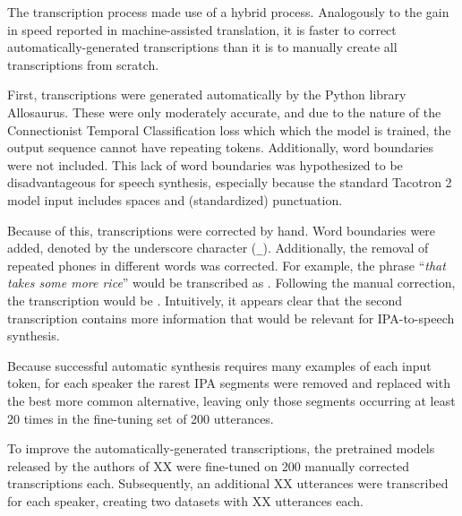 The transcription process made use of a hybrid process. Analogously to the gain in speed reported in 
machine-assisted translation, it is faster to correct automatically-generated transcriptions than it is to 
manually create all transcriptions from scratch.

First, transcriptions were generated automatically by the Python library Allosaurus. 
These were only moderately accurate, and due to the nature of the Connectionist Temporal Classification 
loss which which the model is trained, the output sequence cannot have 
repeating tokens. Additionally, word boundaries were not included. This lack of word boundaries was 
hypothesized to be disadvantageous for speech synthesis, especially because the standard Tacotron 2 model 
input includes spaces and (standardized) punctuation.

Because of this, transcriptions were corrected by hand. Word boundaries were added, denoted by the underscore 
character (\texttt{\_}). Additionally, the removal of repeated phones in different words was corrected. 
For example, the phrase ``\textit{that takes some more rice}'' would be transcribed as 
\textipa{[D}
\textipa{\ae}
\textipa{s]}.
Following the manual correction, the transcription would be 
\textipa{[D}
\textipa{\ae}
\textipa{\_}
\textipa{\_}
\textipa{\_}
\textipa{\_}
\textipa{s]}.
Intuitively, it appears clear that the second transcription contains more information that 
would be relevant for IPA-to-speech synthesis.

Because successful automatic synthesis requires many examples of each input token, for each speaker 
the rarest IPA segments were removed and replaced with the best more common alternative, 
leaving only those segments occurring at least 20 times in the fine-tuning set of 200 utterances.

To improve the automatically-generated transcriptions, the pretrained models released by the authors 
of XX were fine-tuned on 200 manually corrected transcriptions each. Subsequently, an additional XX 
utterances were transcribed for each speaker, creating two datasets with XX utterances each.


